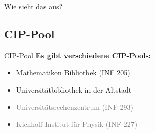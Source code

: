 \begin{frame}{Wie sieht das aus?}
    \begin{center}
    \end{center}
\end{frame}


\subsection{CIP-Pool}
\begin{frame}{CIP-Pool}
    \large
    \textbf{Es gibt verschiedene CIP-Pools:}
    \begin{itemize}
        \item Mathematikon Bibliothek (INF 205)
        \item Universitätbibliothek in der Altstadt
        \item \textcolor{gray}{Universitätsrechenzentrum (INF 293)}
        \item \textcolor{gray}{Kichhoff Institut für Physik (INF 227)}
    \end{itemize}
\end{frame}

